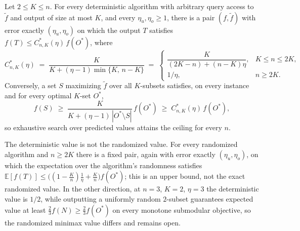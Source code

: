 \begin{proposition}
\label{thm:ceiling}
Let $2\le K\le n$.  For every deterministic algorithm with arbitrary query
access to $\tilde f$ and output of size at most $K$, and every
$\eta_u,\eta_o\ge1$, there is a pair $(f,\tilde f)$ with error exactly
$(\eta_u,\eta_o)$ on which the output $T$ satisfies
$f(T)\le C^{*}_{n,K}(\eta)\,f(O^{\ast})$, where
\[
  C^{*}_{n,K}(\eta)\;=\;\frac{K}{K+(\eta-1)\min\{K,\,n-K\}}
  \;=\;\begin{cases}
    \dfrac{K}{(2K-n)+(n-K)\eta}, & K\le n\le2K,\\[6pt]
    1/\eta, & n\ge2K.
  \end{cases}
\]
Conversely, a set $S$ maximizing $\tilde f$ over all $K$-subsets satisfies,
on every instance and for every optimal $K$-set $O^{\ast}$,
\[
  f(S)\;\ge\;\frac{K}{K+(\eta-1)\,|O^{\ast}\setminus S|}\,f(O^{\ast})
  \;\ge\;C^{*}_{n,K}(\eta)\,f(O^{\ast}),
\]
so exhaustive search over predicted values attains the ceiling for every
$n$.
\end{proposition}
The deterministic value is not the randomized value.  For every randomized
algorithm and $n\ge2K$ there is a fixed pair, again with error exactly
$(\eta_u,\eta_o)$, on which the expectation over the algorithm's randomness
satisfies $\mathbb E[f(T)]\le\bigl((1-\tfrac Kn)\tfrac1\eta+\tfrac Kn\bigr)
f(O^{\ast})$; this is an upper bound, not the exact randomized value.  In
the other direction, at $n=3$, $K=2$, $\eta=3$ the deterministic value is
$1/2$, while outputting a uniformly random $2$-subset guarantees expected
value at least $\tfrac23f(N)\ge\tfrac23f(O^{\ast})$ on every monotone
submodular objective, so the randomized minimax value differs and remains
open.


